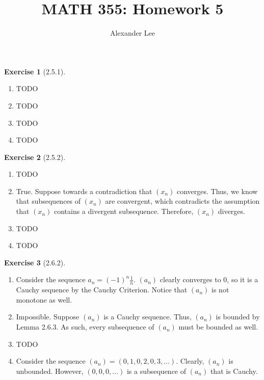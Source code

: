 \documentclass{amsart}
\title{MATH 355: Homework 5}
\author{Alexander Lee}
\theoremstyle{definition}
\newtheorem{exercise}{Exercise}
\begin{document}
\maketitle

\begin{exercise}[2.5.1]
  \begin{enumerate}[label={(\alph*)}]
    \item TODO %
    \item TODO
    \item TODO
    \item TODO
  \end{enumerate}
\end{exercise}

\begin{exercise}[2.5.2]
  \begin{enumerate}[label={(\alph*)}]
    \item TODO %
    \item True. Suppose towards a contradiction that $(x_n)$ converges. Thus, we
      know that subsequences of $(x_n)$ are convergent, which contradicts the
      assumption that $(x_n)$ contains a divergent subsequence. Therefore,
      $(x_n)$ diverges.
    \item TODO
    \item TODO
  \end{enumerate}
\end{exercise}

\begin{exercise}[2.6.2]
  \begin{enumerate}[label={(\alph*)}]
    \item Consider the sequence $a_n = {(-1)}^n \frac{1}{n}$. $(a_n)$ clearly
      converges to 0, so it is a Cauchy sequence by the Cauchy Criterion. Notice
      that $(a_n)$ is not monotone as well.
    \item Impossible. Suppose $(a_n)$ is a Cauchy sequence. Thus, $(a_n)$ is
      bounded by Lemma 2.6.3. As such, every subsequence of $(a_n)$ must be
      bounded as well.
    \item TODO
    \item Consider the sequence $(a_n) = (0, 1, 0, 2, 0, 3, \ldots)$. Clearly,
      $(a_n)$ is unbounded. However, $(0, 0, 0, \ldots)$ is a subsequence of
      $(a_n)$ that is Cauchy.
  \end{enumerate}
\end{exercise}
\end{document}

